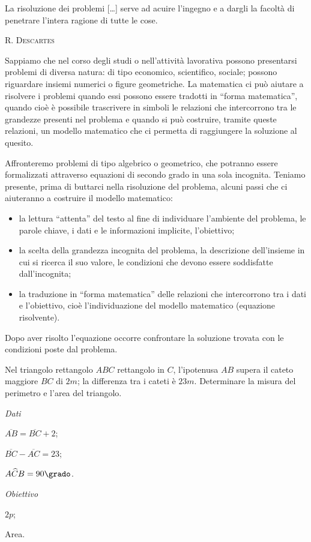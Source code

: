  \epigraph{La risoluzione dei problemi [\ldots] serve ad acuire l'ingegno e a dargli la facoltà di penetrare
 l'intera ragione di tutte le cose.}{{\scshape{R. Descartes}}}

Sappiamo che nel corso degli studi o nell'attività lavorativa possono presentarsi problemi di diversa natura: di tipo economico, scientifico, sociale; possono riguardare insiemi numerici o figure geometriche. La matematica ci può aiutare a risolvere i problemi quando essi possono essere tradotti in ``forma matematica'', quando cioè è possibile trascrivere in simboli le relazioni che intercorrono tra le grandezze presenti nel problema e quando si può costruire, tramite queste relazioni, un modello matematico che ci permetta di raggiungere la soluzione al quesito.

Affronteremo problemi di tipo algebrico o geometrico, che potranno essere formalizzati attraverso equazioni di secondo grado in una sola incognita.
Teniamo presente, prima di buttarci nella risoluzione del problema, alcuni passi che ci aiuteranno a costruire il modello matematico:
\begin{itemize}
\item la lettura ``attenta'' del testo al fine di individuare l'ambiente del problema, le parole chiave, i dati e le informazioni implicite, l'obiettivo;
\item la scelta della grandezza incognita del problema, la descrizione dell'insieme in cui si ricerca il suo valore, le condizioni che devono essere soddisfatte dall'incognita;
\item la traduzione in ``forma matematica'' delle relazioni che intercorrono tra i dati e l'obiettivo, cioè l'individuazione del modello matematico (equazione risolvente).
\end{itemize}
Dopo aver risolto l'equazione occorre confrontare la soluzione trovata con le condizioni poste dal problema.

\begin{problema}
Nel triangolo rettangolo $ABC$ rettangolo in $C$, l'ipotenusa $AB$ supera il cateto maggiore $BC$ di $2\unit{m}$; la differenza tra i cateti è $23\unit{m}$. Determinare la misura del perimetro e l'area del triangolo.
\end{problema}

\begin{multicols}{3}
\emph{Dati}

$\overline {AB} = \overline {BC} + 2$;

$\overline {BC} - \overline {AC} = 23$;

$A \widehat {C} B = 90\grado$.

\emph{Obiettivo}

$2p$;

Area.

 
\end{multicols}

